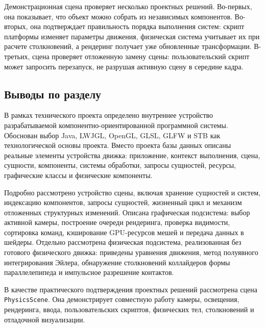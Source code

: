 Демонстрационная сцена проверяет несколько проектных решений. Во-первых, она
показывает, что объект можно собрать из независимых компонентов. Во-вторых,
она подтверждает правильность порядка выполнения систем: скрипт платформы
изменяет параметры движения, физическая система учитывает их при расчете
столкновений, а рендеринг получает уже обновленные трансформации. В-третьих,
сцена проверяет отложенную замену сцены: пользовательский скрипт может запросить
перезапуск, не разрушая активную сцену в середине кадра.

\subsection{Выводы по разделу}

В рамках технического проекта определено внутреннее устройство разрабатываемой
компонентно-ориентированной программной системы. Обоснован выбор Java, LWJGL,
OpenGL, GLSL, GLFW и STB как технологической основы проекта. Вместо проекта
базы данных описаны реальные элементы устройства движка: приложение, контекст
выполнения, сцена, сущности, компоненты, системы обработки, запросы сущностей,
ресурсы, графические классы и физические компоненты.

Подробно рассмотрено устройство сцены, включая хранение сущностей и систем,
индексацию компонентов, запросы сущностей, жизненный цикл и механизм отложенных
структурных изменений. Описана графическая подсистема: выбор активной камеры,
построение очереди рендеринга, проверка видимости, сортировка команд, кэширование
GPU-ресурсов мешей и передача данных в шейдеры. Отдельно рассмотрена физическая
подсистема, реализованная без готового физического движка: приведены уравнения
движения, метод полуявного интегрирования Эйлера, обнаружение столкновений
коллайдеров формы параллелепипеда и импульсное разрешение контактов.

В качестве практического подтверждения проектных решений рассмотрена сцена
\texttt{PhysicsScene}. Она демонстрирует совместную работу камеры, освещения,
рендеринга, ввода, пользовательских скриптов, физических тел, столкновений и
отладочной визуализации.
